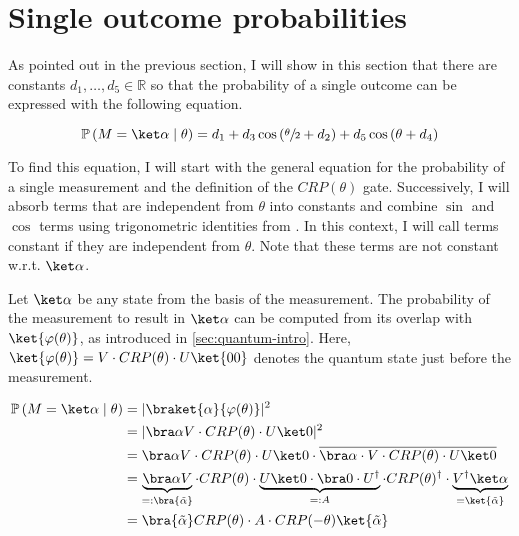 \section{Single outcome probabilities}
\label{sec:single-outcome-probability}

As pointed out in the previous section, I will show in this section that there
are constants $d_1, \dots, d_5 \in \mathbb R$ so that the probability of a
single outcome can be expressed with the following equation.

\begin{equation}
    \mathbb P\left(M = \ket \alpha \mid \theta\right)
        = d_1 + d_3 \cos\left(\sfrac\theta2 + d_2\right) + d_5 \cos\left(\theta + d_4\right)
\end{equation}

To find this equation, I will start with the general equation for the
probability of a single measurement and the definition of the $CRP(\theta)$
gate. 
Successively, I will absorb terms that are independent from $\theta$ into
constants and combine $\sin$ and $\cos$ terms using trigonometric identities
from \cite{bronstejn_taschenbuch_2016}.
In this context, I will call terms constant if they are independent from
$\theta$.
Note that these terms are not constant w.r.t. $\ket\alpha$.

Let $\ket\alpha$ be any state from the basis of the measurement.
The probability of the measurement to result in $\ket\alpha$ can be computed
from its overlap with $\ket{\varphi(\theta)}$, as introduced in
\autoref{sec:quantum-intro}.
Here, $\ket{\varphi(\theta)} = V \cdot CRP(\theta) \cdot U\ket{00}$ denotes the
quantum state just before the measurement.

\begin{equation}
    \label{eq:single-outcome-prob}
    \begin{split}
        \mathbb P\left(M = \ket\alpha \mid \theta\right)
            &= \lvert\braket{\alpha}{\varphi(\theta)}\rvert^2\\
            &= \lvert \bra\alpha V \cdot CRP(\theta) \cdot U \ket0 \rvert^2 \\
            &= \bra\alpha V \cdot CRP(\theta) \cdot U \ket0
                \cdot \overline{\bra\alpha \cdot V \cdot CRP(\theta) \cdot U \ket0} \\
            &= \underbrace{\bra\alpha V}_{=: \bra{\tilde\alpha}} \cdot CRP(\theta)
                \cdot \underbrace{U \ket0 \cdot \bra0 \cdot U^\dagger}_{=: A} \cdot CRP(\theta)^\dagger
                \cdot \underbrace{V^\dagger \ket\alpha}_{=\ket{\tilde\alpha}} \\
            &= \bra{\tilde\alpha} CRP(\theta) \cdot A \cdot CRP(-\theta) \ket{\tilde\alpha}
    \end{split}
\end{equation}

